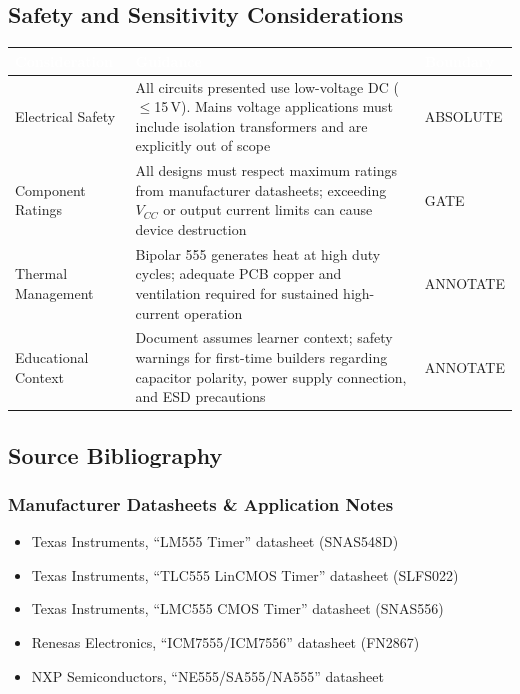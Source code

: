 \documentclass[11pt,letterpaper]{article}
\newcommand{\tableheader}[1]{\textbf{\sffamily\textcolor{white}{#1}}}
\begin{document}
\subsection{Safety and Sensitivity Considerations}

\begin{center}
\begin{tabularx}{\textwidth}{L{3.5cm}XC{2cm}}
\toprule
{}
\tableheader{Consideration} & \tableheader{Guidance} & \tableheader{Boundary} \\
\midrule
Electrical Safety & All circuits presented use low-voltage DC ($\leq$15\,V). Mains voltage applications must include isolation transformers and are explicitly out of scope & ABSOLUTE \\
Component Ratings & All designs must respect maximum ratings from manufacturer datasheets; exceeding $V_{CC}$ or output current limits can cause device destruction & GATE \\
Thermal Management & Bipolar 555 generates heat at high duty cycles; adequate PCB copper and ventilation required for sustained high-current operation & ANNOTATE \\
Educational Context & Document assumes learner context; safety warnings for first-time builders regarding capacitor polarity, power supply connection, and ESD precautions & ANNOTATE \\
\bottomrule
\end{tabularx}
\end{center}

\subsection{Source Bibliography}

\subsubsection{Manufacturer Datasheets \& Application Notes}

\begin{itemize}[leftmargin=2em]
  \item Texas Instruments, ``LM555 Timer'' datasheet (SNAS548D)
  \item Texas Instruments, ``TLC555 LinCMOS Timer'' datasheet (SLFS022)
  \item Texas Instruments, ``LMC555 CMOS Timer'' datasheet (SNAS556)
  \item Renesas Electronics, ``ICM7555/ICM7556'' datasheet (FN2867)
  \item NXP Semiconductors, ``NE555/SA555/NA555'' datasheet
\end{itemize}
\end{document}
